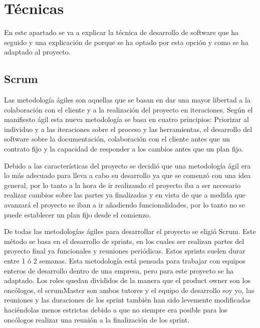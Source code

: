 
\section{Técnicas}

En este apartado se va a explicar la técnica de desarrollo de software que ha seguido y una explicación de porque se ha optado por esta opción y como se ha adaptado al proyecto.

\subsection{Scrum}

Las metodología ágiles son aquellas que se basan en dar una mayor libertad a la colaboración con el cliente y a la realización del proyecto en iteraciones. Según el manifiesto ágil esta nueva metodología se basa en cuatro principios: Priorizar al individuo y a las iteraciones sobre el proceso y las herramientas, el desarrollo del software sobre la documentación, colaboración con el cliente antes que un contrato fijo y la capacidad de responder a los cambios antes que un plan fijo\cite{metodologia_agil}.

Debido a las características del proyecto se decidió que una metodología ágil era lo más adecuado para lleva a cabo su desarrollo ya que se comenzó con una idea general, por lo tanto a la hora de ir realizando el proyecto iba a ser necesario realizar cambios sobre las partes ya finalizadas y en vista de que a medida que avanzará el proyecto se iban a ir añadiendo funcionalidades, por lo tanto no se puede establecer un plan fijo desde el comienzo\cite{metodologia_agil}.

De todas las metodologías ágiles para desarrollar el proyecto se eligió Scrum. Este método se basa en el desarrollo de sprints, en los cuales ser realizan partes del proyecto final ya funcionales y reuniones periódicas. Estos sprints suelen durar entre 1 ó 2 semanas\cite{scrum}. Esta metodología está pensada para trabajar con equipos enteros de desarrollo dentro de una empresa, pero para este proyecto se ha adaptado. Los roles quedan divididos de la manera que el product owner son los oncólogos, el scrumMaster son ambos tutores y el equipo de desarrollo soy yo, las reuniones y las duraciones de los sprint también han sido levemente modificadas haciéndolas menos estrictas debido a que no siempre era posible para los oncólogos realizar una reunión a la finalización de los sprint.

